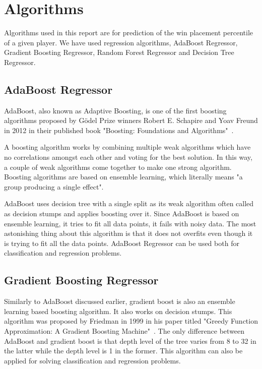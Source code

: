 \documentclass[journal,twoside,web]{ieeecolor}
\begin{document}
\section{Algorithms}
\label{sec:algorithms}
Algorithms used in this report are for prediction of the win placement percentile of a given player. We have used regression algorithms, AdaBoost Regressor, Gradient Boosting Regressor, Random Forest Regressor and Decision Tree Regressor.

\subsection{AdaBoost Regressor}
AdaBoost, also known as Adaptive Boosting, is one of the first boosting algorithms proposed by Gödel Prize winners Robert E. Schapire and Yoav Freund in 2012 in their published book "Boosting: Foundations and Algorithms"~\cite{schapire_boosting_2012}. 

A boosting algorithm works by combining multiple weak algorithms which have no correlations amongst each other and voting for the best solution. In this way, a couple of weak algorithms come together to make one strong algorithm. Boosting algorithms are based on ensemble learning, which literally means "a group producing a single effect".

AdaBoost uses decision tree with a single split as its weak algorithm often called as decision stumps and applies boosting over it. Since AdaBoost is based on ensemble learning, it tries to fit all data points, it fails with noisy data. The most astonishing thing about this algorithm is that it does not overfits even though it is trying to fit all the data points. AdaBoost Regressor can be used both for classification and regression problems.

\subsection{Gradient Boosting Regressor}
Similarly to AdaBoost discussed earlier, gradient boost is also an ensemble learning based boosting algorithm. It also works on decision stumps. This algorithm was proposed by Friedman in 1999 in his paper titled "Greedy Function Approximation: A Gradient Boosting Machine"~\cite{friedman_greedy_2001}. The only difference between AdaBoost and gradient boost is that depth level of the tree varies from 8 to 32 in the latter while the depth level is 1 in the former. This algorithm can also be applied for solving classification and regression problems.
\end{document}
